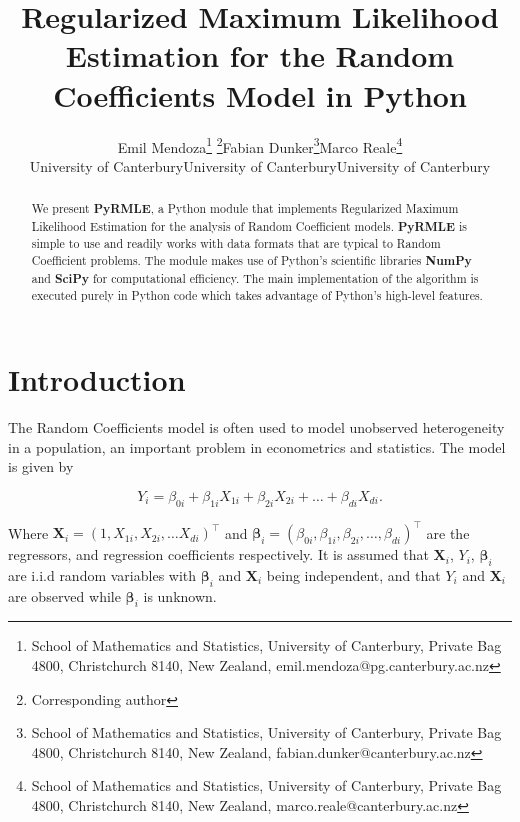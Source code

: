 \documentclass[a4paper,12pt]{article}
\newcommand{\bbeta}{{\boldsymbol{\beta}}}
\newcommand{\bX}{\mathbf{X}}
\begin{document}
\title{Regularized Maximum Likelihood Estimation for the Random Coefficients Model in Python}
\author{\begin{tabular}{ccc}
Emil Mendoza\footnote{School of Mathematics and Statistics, University of Canterbury, Private Bag 4800, Christchurch 8140, New Zealand, emil.mendoza@pg.canterbury.ac.nz} \footnote{Corresponding author} &
Fabian Dunker\footnote{School of Mathematics and Statistics, University of Canterbury, Private Bag 4800, Christchurch 8140, New Zealand, fabian.dunker@canterbury.ac.nz} & Marco Reale\footnote{School of Mathematics and Statistics, University of Canterbury, Private Bag 4800, Christchurch 8140, New Zealand, marco.reale@canterbury.ac.nz}\\
\small{University of Canterbury}  & \small{University of Canterbury}  & \small{University of Canterbury}
\end{tabular}
}
\maketitle

\begin{abstract}
	\noindent 
	We present \textbf{PyRMLE}, a Python module that implements Regularized Maximum Likelihood Estimation for the analysis of Random Coefficient models. \textbf{PyRMLE} is simple to use and readily works with data formats that are typical to Random Coefficient problems. The module makes use of Python's scientific libraries \textbf{NumPy} and \textbf{SciPy} for computational efficiency. The main implementation of the algorithm is executed purely in Python code which takes advantage of Python's high-level features. 
\end{abstract}


\section{Introduction} \label{sec:method}

The Random Coefficients model is often used to model unobserved heterogeneity in a population, an important problem in econometrics and statistics. The model is given by

\begin{equation}\label{eqn:rc_model}
	Y_i=\beta_{0i}+\beta_{1i} X_{1i}+\beta_{2i} X_{2i}+\ldots+\beta_{di} X_{di}.
\end{equation}

Where $\bX_i = (1, X_{1i}, X_{2i}, \ldots X_{di})^\top$ and  $\bbeta_i = (\beta_{0i}, \beta_{1i}, \beta_{2i}, \ldots, \beta_{di})^\top$ are the regressors, and regression coefficients respectively. It is assumed that $\bX_i$, $Y_i$, $\bbeta_i$ are i.i.d random variables with $\bbeta_i$ and $\bX_i$ being independent, and that $Y_i$ and $\bX_i$ are observed while $\bbeta_i$ is unknown. 
\end{document}
